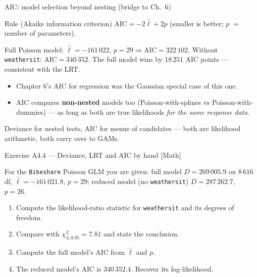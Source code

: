 \documentclass[aspectratio=169,11pt]{beamer}
\begin{document}
\begin{frame}{AIC: model selection beyond nesting (bridge to Ch.\ 6)}
  \footnotesize
  \begin{block}{Rule (Akaike information criterion)}
    \footnotesize
    $\text{AIC} = -2\hat\ell + 2p$ \quad (smaller is better; $p$ $=$ number of parameters).
  \end{block}
  \begin{numexample}
    Full Poisson model: $\hat\ell = -161\,022$, $p = 29 \Rightarrow \text{AIC} =
    322\,102$. Without \texttt{weathersit}: $\text{AIC} = 340\,352$. The full model
    wins by $18\,251$ AIC points --- consistent with the LRT.
  \end{numexample}
  \begin{readme}
    \begin{itemize}
      \item Chapter 6's AIC for regression was the Gaussian special case of this one.
      \item AIC compares \textbf{non-nested} models too (Poisson-with-splines vs
            Poisson-with-dummies) --- as long as both are true likelihoods
            \emph{for the same response data}.
    \end{itemize}
  \end{readme}
  \begin{takeaway}
    Deviance for nested tests, AIC for menus of candidates --- both are likelihood
    arithmetic, both carry over to GAMs.
  \end{takeaway}
\end{frame}

\begin{frame}{Exercise A4.4 --- Deviance, LRT and AIC by hand [Math]}
\begin{exercise}
  For the \texttt{Bikeshare} Poisson GLM you are given:
  full model $D = 269\,005.9$ on $8\,616$ df, $\hat\ell = -161\,021.8$, $p = 29$;
  reduced model (no \texttt{weathersit}) $D = 287\,262.7$, $p = 26$.
  \begin{enumerate}
    \item Compute the likelihood-ratio statistic for \texttt{weathersit} and its
          degrees of freedom.
    \item Compare with $\chi^2_{3,0.95} = 7.81$ and state the conclusion.
    \item Compute the full model's AIC from $\hat\ell$ and $p$.
    \item The reduced model's AIC is $340\,352.4$. Recover its log-likelihood.
  \end{enumerate}
\end{exercise}
\end{frame}
\end{document}
